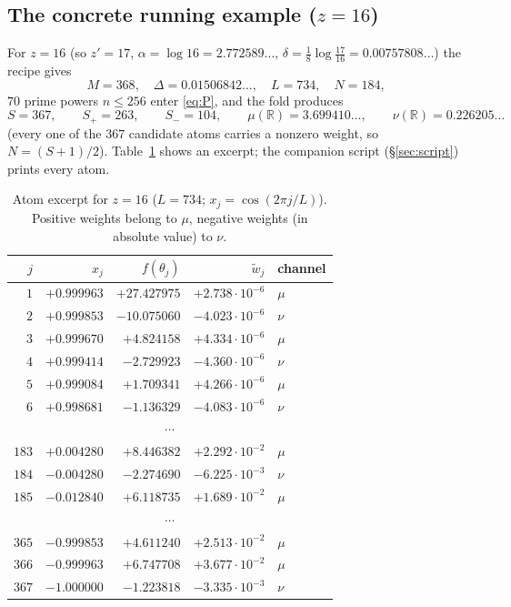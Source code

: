 \documentclass[11pt]{article}
\theoremstyle{remark}
\newcommand{\R}{\mathbb{R}}
\begin{document}
\subsection{The concrete running example \texorpdfstring{($z=16$)}{(z=16)}}
\label{sec:example}

For $z=16$ (so $z'=17$, $\alpha=\log 16=2.772589\ldots$,
$\delta=\tfrac18\log\tfrac{17}{16}=0.00757808\ldots$) the recipe gives
\[
M=368,\quad \Delta=0.01506842\ldots,\quad L=734,\quad N=184,
\]
$70$ prime powers $n\le 256$ enter \eqref{eq:P}, and the fold produces
\[
S=367,\qquad S_{+}=263,\qquad S_{-}=104,\qquad
\mu(\R)=3.699410\ldots,\qquad \nu(\R)=0.226205\ldots
\]
(every one of the $367$ candidate atoms carries a nonzero weight, so
$N=(S+1)/2$).  Table~\ref{tab:atoms} shows an excerpt; the companion
script (\S\ref{sec:script}) prints every atom.

\begin{table}[ht]
\centering
\caption{Atom excerpt for $z=16$ ($L=734$; $x_{j}=\cos(2\pi j/L)$).
Positive weights belong to $\mu$, negative weights (in absolute value)
to $\nu$.}
\label{tab:atoms}
\begin{tabular}{rrrrl}
\toprule
$j$ & $x_{j}$ & $f(\theta_{j})$ & $\widetilde w_{j}$ & channel\\
\midrule
$1$   & $+0.999963$ & $+27.427975$ & $+2.738\cdot10^{-6}$ & $\mu$\\
$2$   & $+0.999853$ & $-10.075060$ & $-4.023\cdot10^{-6}$ & $\nu$\\
$3$   & $+0.999670$ & $+4.824158$  & $+4.334\cdot10^{-6}$ & $\mu$\\
$4$   & $+0.999414$ & $-2.729923$  & $-4.360\cdot10^{-6}$ & $\nu$\\
$5$   & $+0.999084$ & $+1.709341$  & $+4.266\cdot10^{-6}$ & $\mu$\\
$6$   & $+0.998681$ & $-1.136329$  & $-4.083\cdot10^{-6}$ & $\nu$\\
\multicolumn{5}{c}{$\cdots$}\\
$183$ & $+0.004280$ & $+8.446382$  & $+2.292\cdot10^{-2}$ & $\mu$\\
$184$ & $-0.004280$ & $-2.274690$  & $-6.225\cdot10^{-3}$ & $\nu$\\
$185$ & $-0.012840$ & $+6.118735$  & $+1.689\cdot10^{-2}$ & $\mu$\\
\multicolumn{5}{c}{$\cdots$}\\
$365$ & $-0.999853$ & $+4.611240$  & $+2.513\cdot10^{-2}$ & $\mu$\\
$366$ & $-0.999963$ & $+6.747708$  & $+3.677\cdot10^{-2}$ & $\mu$\\
$367$ & $-1.000000$ & $-1.223818$  & $-3.335\cdot10^{-3}$ & $\nu$\\
\bottomrule
\end{tabular}
\end{table}
\end{document}
